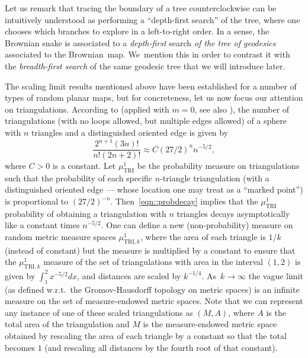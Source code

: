 \documentclass[10pt]{amsart}
\theoremstyle{plain}
\numberwithin{theorem}{section}
\theoremstyle{definition}
\begin{document}
Let us remark that tracing the boundary of a tree counterclockwise can be intuitively understood as performing a ``depth-first search'' of the tree, where one chooses which branches to explore in a left-to-right order. In a sense, the Brownian snake is associated to a \emph{depth-first} search \emph{of the tree of geodesics} associated to the Brownian~map. We~mention this in order to contrast it with the \emph{breadth-first search} of the same geodesic tree that we will introduce later.

The scaling limit results mentioned above have been established for a number of types of random planar maps, but for concreteness, let us now focus our attention on triangulations. According to \cite[Th.\,2.1]{angelschrammUIPT} (applied with $m=0$, see also \cite{angelUIPTpercolation}), the number of triangulations (with no loops allowed, but multiple edges allowed) of a sphere with $n$ triangles and a distinguished oriented edge is given by
\begin{equation}
\label{eqn::probdecay}
\frac{2^{n+1} (3n)!}{n! (2n+2)!} \approx C (27/2)^n n^{-5/2},
\end{equation}
where $C > 0$ is a constant. Let $\mu^1_{\mathrm{TRI}}$ be the probability measure on triangulations such that the probability of each specific $n$-triangle triangulation (with a distinguished oriented edge --- whose location one may treat as a ``marked point'') is proportional to $(27/2)^{-n}$. Then~\eqref{eqn::probdecay} implies that the $\mu^1_{\mathrm{TRI}}$ probability of obtaining a triangulation with $n$ triangles decays asymptotically like a constant times $n^{-5/2}$. One can define a new (non-probability) measure on random metric measure spaces $\mu^1_{\mathrm{TRI},k}$, where the area of each triangle is $1/k$ (instead of constant) but the measure is multiplied by a constant to ensure that the $\mu^1_{\mathrm{TRI},k}$ measure of the set of triangulations with area in the interval $(1,2)$ is given by $\int_1^2 x^{-5/2} dx$, and distances are scaled by $k^{-1/4}$. As~$k \to \infty$ the vague limit (as defined w.r.t.\ the Gromov-Hausdorff topology on metric spaces) is an infinite measure on the set of measure-endowed metric spaces. Note that we can represent any instance of one of these scaled triangulations as $(M, A)$, where $A$ is the total area of the triangulation and $M$ is the measure-endowed metric space obtained by rescaling the area of each triangle by a constant so that the total becomes $1$ (and rescaling all distances by the fourth root of that constant).
\end{document}
